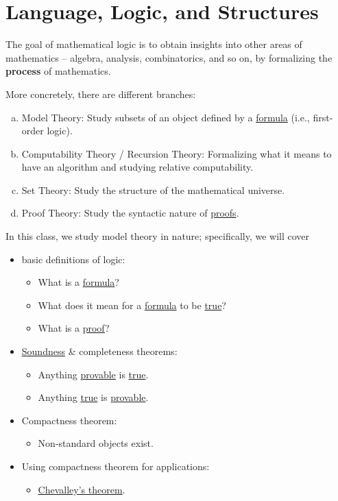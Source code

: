 \chapter{Language, Logic, and Structures}
The goal of mathematical logic is to obtain insights into other areas of mathematics -- algebra, analysis, combinatorics, and so on, by formalizing the \textbf{process} of mathematics.

\begin{remark}
	More concretely, there are different branches:
	\begin{enumerate}[(a)]
		\item Model Theory: Study subsets of an object defined by a \hyperref[def:formula]{formula} (i.e., first-order logic).
		\item Computability Theory / Recursion Theory: Formalizing what it means to have an algorithm and studying relative computability.
		\item Set Theory: Study the structure of the mathematical universe.
		\item Proof Theory: Study the syntactic nature of \hyperref[def:proof]{proofs}.
	\end{enumerate}
\end{remark}

In this class, we study model theory in nature; specifically, we will cover
\begin{itemize}
	\item basic definitions of logic:
	      \begin{itemize}
		      \item What is a \hyperref[def:formula]{formula}?
		      \item What does it mean for a \hyperref[def:formula]{formula} to be \hyperref[def:truth]{true}?
		      \item What is a \hyperref[def:proof]{proof}?
	      \end{itemize}
	\item \hyperref[thm:soundness]{Soundness} \& completeness theorems:
	      \begin{itemize}
		      \item Anything \hyperref[def:proof]{provable} is \hyperref[def:truth]{true}.
		      \item Anything \hyperref[def:truth]{true} is \hyperref[def:proof]{provable}.
	      \end{itemize}
	\item Compactness theorem:
	      \begin{itemize}
		      \item Non-standard objects exist.
	      \end{itemize}
	\item Using compactness theorem for applications:
	      \begin{itemize}
		      \item \href{https://en.wikipedia.org/wiki/Chevalley's_structure_theorem}{Chevalley's theorem}.
	      \end{itemize}
\end{itemize}

